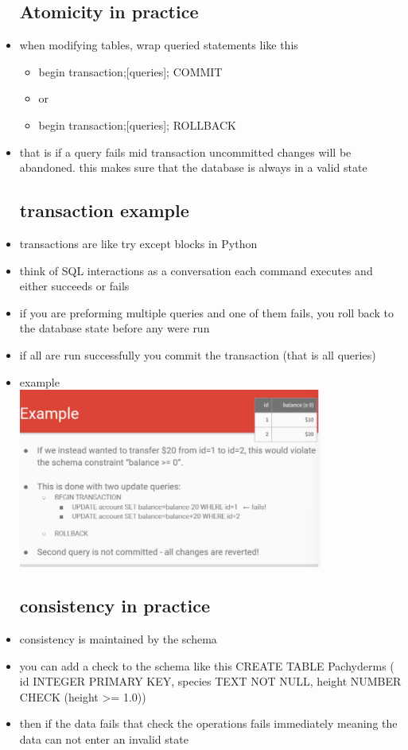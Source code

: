 \documentclass{article}
\begin{document}
\begin{itemize}
\subsection{Atomicity  in practice}
\item when modifying tables, wrap queried statements like this 
\begin{itemize}
    \item begin transaction;[queries]; COMMIT
    \item or 
    \item begin transaction;[queries]; ROLLBACK
\end{itemize}
\item that is if a query fails mid transaction uncommitted changes will be abandoned. this makes sure that the database is always in a valid state
\subsection{transaction example}
\item transactions are like try except blocks in Python
\item think of SQL interactions as a conversation each command executes and either succeeds or fails 
\item if you are preforming multiple queries and one of them fails, you roll back to the database state before any were run 
\item if all are run successfully you commit the transaction (that is all queries) 
\item example \\ \includegraphics[width=10cm]{lecture notes/week 2/immages/w_1_6.jpg}

\subsection{consistency in practice}
\item consistency is maintained by the schema 
\item you can add a check to the schema like this CREATE TABLE Pachyderms ( id INTEGER PRIMARY KEY,
species TEXT NOT NULL,
height NUMBER CHECK (height >= 1.0))
\item then if the data fails that check the operations fails immediately meaning the data can not enter an invalid state

\end{itemize}
\end{document}

